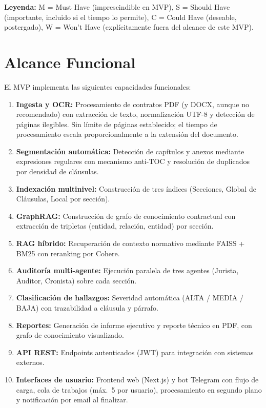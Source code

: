 \noindent\textbf{Leyenda:} M = Must Have (imprescindible en MVP),
S = Should Have (importante, incluido si el tiempo lo permite),
C = Could Have (deseable, postergado), W = Won't Have (explícitamente
fuera del alcance de este MVP).

\section{Alcance Funcional}

El MVP implementa las siguientes capacidades funcionales:

\begin{enumerate}
    \item \textbf{Ingesta y OCR:} Procesamiento de contratos PDF (y DOCX,
    aunque no recomendado) con extracción de texto, normalización UTF-8
    y detección de páginas ilegibles. Sin límite de páginas establecido;
    el tiempo de procesamiento escala proporcionalmente a la extensión
    del documento.
    \item \textbf{Segmentación automática:} Detección de capítulos y anexos
    mediante expresiones regulares con mecanismo anti-TOC y resolución de
    duplicados por densidad de cláusulas.
    \item \textbf{Indexación multinivel:} Construcción de tres índices
    (Secciones, Global de Cláusulas, Local por sección).
    \item \textbf{GraphRAG:} Construcción de grafo de conocimiento contractual
    con extracción de tripletas (entidad, relación, entidad) por sección.
    \item \textbf{RAG híbrido:} Recuperación de contexto normativo mediante
    FAISS + BM25 con reranking por Cohere.
    \item \textbf{Auditoría multi-agente:} Ejecución paralela de tres agentes
    (Jurista, Auditor, Cronista) sobre cada sección.
    \item \textbf{Clasificación de hallazgos:} Severidad automática (ALTA /
    MEDIA / BAJA) con trazabilidad a cláusula y párrafo.
    \item \textbf{Reportes:} Generación de informe ejecutivo y reporte técnico
    en PDF, con grafo de conocimiento visualizado.
    \item \textbf{API REST:} Endpoints autenticados (JWT) para integración con
    sistemas externos.
    \item \textbf{Interfaces de usuario:} Frontend web (Next.js) y bot
    Telegram con flujo de carga, cola de trabajos (máx.\ 5 por usuario),
    procesamiento en segundo plano y notificación por email al finalizar.
\end{enumerate}

